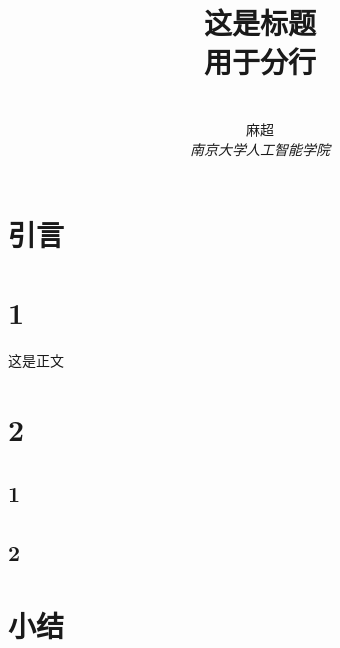 \documentclass[12pt,a4paper]{article}
\title{\textbf{这是标题\\用于分行}}%
\author{
\\
\Large{麻超 \quad 201300066}
\\[6pt]
{ \large \textit{南京大学人工智能学院}}\\[2pt]
}
\date{}
\newcommand{\supercite}[1]{\textsuperscript{\cite{#1}}}
\begin{document}
\maketitle
\setcounter{page}{1}


\section*{引言}

\section{1}
这是正文\supercite{1}

\section{2}
\subsection{1}%

\subsection{2}

\section{小结}




\end{document}
